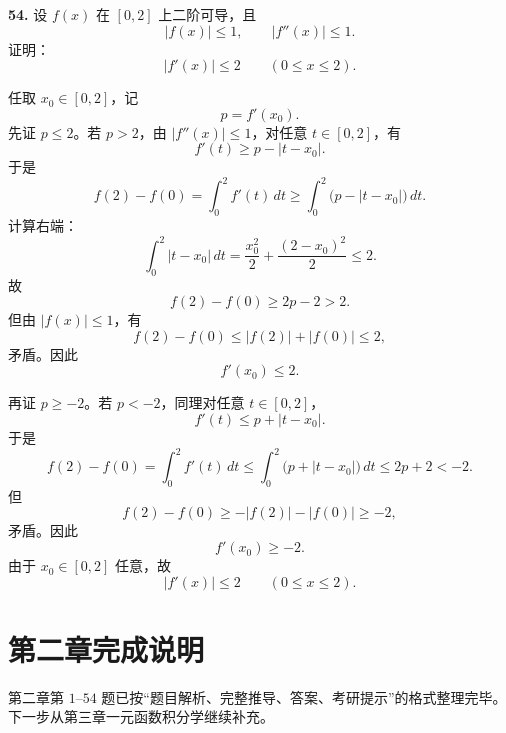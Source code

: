 \begin{problemblock}
\textbf{54.} 设 \(f(x)\) 在 \([0,2]\) 上二阶可导，且
\[
|f(x)|\le1,\qquad |f''(x)|\le1.
\]
证明：
\[
|f'(x)|\le2\qquad(0\le x\le2).
\]
\end{problemblock}

\begin{solutionblock}
任取 \(x_0\in[0,2]\)，记
\[
p=f'(x_0).
\]
先证 \(p\le2\)。若 \(p>2\)，由 \(|f''(x)|\le1\)，对任意 \(t\in[0,2]\)，有
\[
f'(t)\ge p-|t-x_0|.
\]
于是
\[
f(2)-f(0)=\int_0^2 f'(t)\,dt
\ge \int_0^2 \bigl(p-|t-x_0|\bigr)\,dt.
\]
计算右端：
\[
\int_0^2 |t-x_0|\,dt
=\frac{x_0^2}{2}+\frac{(2-x_0)^2}{2}\le2.
\]
故
\[
f(2)-f(0)\ge 2p-2>2.
\]
但由 \(|f(x)|\le1\)，有
\[
f(2)-f(0)\le |f(2)|+|f(0)|\le2,
\]
矛盾。因此
\[
f'(x_0)\le2.
\]

再证 \(p\ge-2\)。若 \(p<-2\)，同理对任意 \(t\in[0,2]\)，
\[
f'(t)\le p+|t-x_0|.
\]
于是
\[
f(2)-f(0)=\int_0^2 f'(t)\,dt
\le \int_0^2 \bigl(p+|t-x_0|\bigr)\,dt
\le 2p+2<-2.
\]
但
\[
f(2)-f(0)\ge -|f(2)|-|f(0)|\ge-2,
\]
矛盾。因此
\[
f'(x_0)\ge-2.
\]
由于 \(x_0\in[0,2]\) 任意，故
\[
|f'(x)|\le2\qquad(0\le x\le2).
\]
\end{solutionblock}

\section{第二章完成说明}
第二章第 \(1\)--\(54\) 题已按“题目解析、完整推导、答案、考研提示”的格式整理完毕。下一步从第三章一元函数积分学继续补充。
